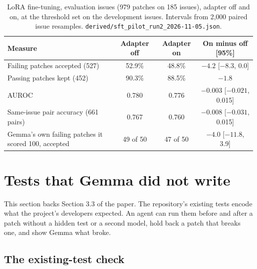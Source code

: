 \documentclass[10pt,letterpaper]{article}
\begin{document}
\begin{table}[H]
\centering
\small
\caption{LoRA fine-tuning, evaluation issues (979 patches on 185 issues), adapter off and on, at the threshold set on
the development issues. Intervals from 2,000 paired issue resamples. \texttt{derived/sft\_pilot\_run2\_2026-11-05.json}.}
\label{tab:lora}
\begin{tabular}{@{}lccc@{}}
\toprule
Measure & Adapter off & Adapter on & On minus off [95\%] \\
\midrule
Failing patches accepted (527) & 52.9\% & 48.8\% & $-4.2$ [$-8.3$, 0.0] \\
Passing patches kept (452) & 90.3\% & 88.5\% & $-1.8$ \\
AUROC & 0.780 & 0.776 & $-0.003$ [$-0.021$, 0.015] \\
Same-issue pair accuracy (661 pairs) & 0.767 & 0.760 & $-0.008$ [$-0.031$, 0.015] \\
Gemma's own failing patches it scored 100, accepted & 49 of 50 & 47 of 50 & $-4.0$ [$-11.8$, 3.9] \\
\bottomrule
\end{tabular}
\end{table}

\section{Tests that Gemma did not write}
\label{app:repair}

This section backs Section 3.3 of the paper. The repository's existing tests encode what the project's developers
expected. An agent can run them before and after a patch without a hidden test or a second model, hold back a patch
that breaks one, and show Gemma what broke.

\subsection*{The existing-test check}
\end{document}
